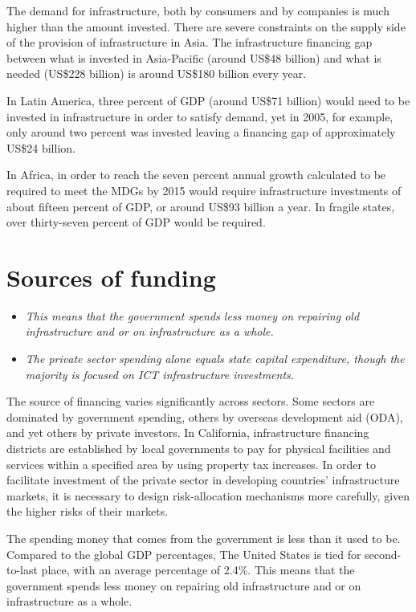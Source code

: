 The demand for infrastructure, both by consumers and by companies is
much higher than the amount invested. There are severe constraints on
the supply side of the provision of infrastructure in Asia. The
infrastructure financing gap between what is invested in Asia-Pacific
(around US\$48 billion) and what is needed (US\$228 billion) is around
US\$180 billion every year.

In Latin America, three percent of GDP (around US\$71 billion) would
need to be invested in infrastructure in order to satisfy demand, yet in
2005, for example, only around two percent was invested leaving a
financing gap of approximately US\$24 billion.

In Africa, in order to reach the seven percent annual growth calculated
to be required to meet the MDGs by 2015 would require infrastructure
investments of about fifteen percent of GDP, or around US\$93 billion a
year. In fragile states, over thirty-seven percent of GDP would be
required.

\section{Sources of funding}\label{sources-of-funding}

\begin{itemize}
\item
  \emph{This means that the government spends less money on repairing
  old infrastructure and or on infrastructure as a whole.}
\item
  \emph{The private sector spending alone equals state capital
  expenditure, though the majority is focused on ICT infrastructure
  investments.}
\end{itemize}

The source of financing varies significantly across sectors. Some
sectors are dominated by government spending, others by overseas
development aid (ODA), and yet others by private investors. In
California, infrastructure financing districts are established by local
governments to pay for physical facilities and services within a
specified area by using property tax increases. In order to facilitate
investment of the private sector in developing countries' infrastructure
markets, it is necessary to design risk-allocation mechanisms more
carefully, given the higher risks of their markets.

The spending money that comes from the government is less than it used
to be. Compared to the global GDP percentages, The United States is tied
for second-to-last place, with an average percentage of 2.4\%. This
means that the government spends less money on repairing old
infrastructure and or on infrastructure as a whole.

